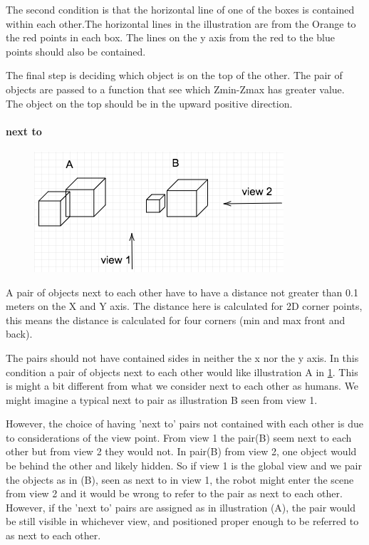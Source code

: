 The second condition is that the horizontal line of one of the boxes is contained within each other.The horizontal lines in the illustration are from the Orange to the red points in each box. The lines on the y axis from the red to the blue points should also be contained. 

The final step is deciding which object is on the top of the other. The pair of objects are passed to a function that see which Zmin-Zmax has greater value. The object on the top should be in the upward positive direction. 


\paragraph{next to}


\begin{figure}[H]
\includegraphics[scale=0.5]{images/Nextview.png}
\caption{}
\label{fig:next}
\end{figure}


A pair of objects next to each other have to have a distance not greater than 0.1 meters on the X and Y axis. The distance here is calculated for 2D corner points, this means the distance is calculated for four corners (min and max front and back).

The pairs should not have contained sides in neither the x nor the y axis. In this condition a pair of objects next to each other would like illustration A in \ref{fig:next}. This is might a bit different from what we consider next to each other as humans. We might imagine a typical next to pair as illustration B seen from view 1.

However, the choice of having 'next to' pairs not contained with each other is due to considerations of the view point. From view 1 the pair(B) seem next to each other but from view 2 they would not. In pair(B) from view 2, one object would be behind the other and likely hidden. So if view 1 is the global view and we pair the objects as in (B), seen as next to in view 1, the robot might enter the scene from view 2 and it would be wrong to refer to the pair as next to each other. However, if the 'next to' pairs are assigned as in illustration (A), the pair would be still visible in whichever view, and positioned proper enough to be referred to as next to each other. 

